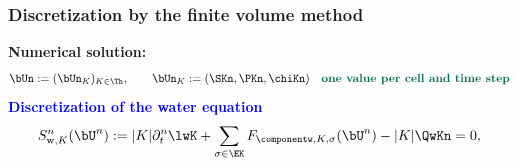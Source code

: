 \documentclass[aspectratio=169]{beamer}
\begin{document}

\begin{frame}
\frametitle{Discretization by the finite volume method}
\textcolor{cadmiumgreen}{\textbf{Numerical solution: }}
\begin{equation*}
 \bUn \egaldef (\bUn_K)_{K\in \Th}, \qquad \bUn_K \egaldef  (\SKn,\PKn,\chiKn) \quad \textcolor{cadmiumgreen}{\textbf{one value per cell and time step}} 
\end{equation*}
\textcolor{blue}{\textbf{Discretization of the water equation}}
\begin{equation*}
S_{\mathrm{w},K}^n(\bU^n) \egaldef |K| \partial_t^n \lwK  + \sum_{\sigma \in \EK} {F}_{\componentw,K,\sigma}(\bU^{n})- |K|\QwKn = 0,
\end{equation*}
\end{frame}
\end{document}
